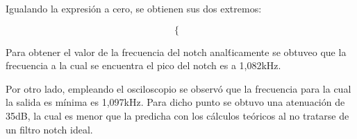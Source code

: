 Igualando la expresi\'on a cero, se obtienen sus dos extremos:

\begin{equation}
	\begin{cases}
	
	\end{cases}
\end{equation}

Para obtener el valor de la frecuencia del notch anal\'ticamente se obtuveo que la frecuencia a la cual se encuentra el pico del notch es a 1,082kHz.


Por otro lado, empleando el osciloscopio se observ\'o que la frecuencia para la cual la salida es m\'inima es 1,097kHz. Para dicho punto se obtuvo una atenuaci\'on de 35dB, la cual es menor que la predicha con los c\'alculos te\'oricos al no tratarse de un filtro notch ideal.


